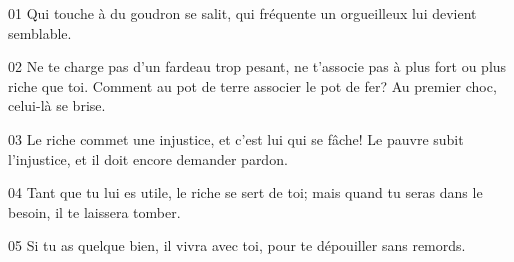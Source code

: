 01 Qui touche à du goudron se salit, qui fréquente un orgueilleux lui devient semblable.

02 Ne te charge pas d’un fardeau trop pesant, ne t’associe pas à plus fort ou plus riche que toi. Comment au pot de terre associer le pot de fer? Au premier choc, celui-là se brise.

03 Le riche commet une injustice, et c’est lui qui se fâche! Le pauvre subit l’injustice, et il doit encore demander pardon.

04 Tant que tu lui es utile, le riche se sert de toi; mais quand tu seras dans le besoin, il te laissera tomber.

05 Si tu as quelque bien, il vivra avec toi, pour te dépouiller sans remords.
